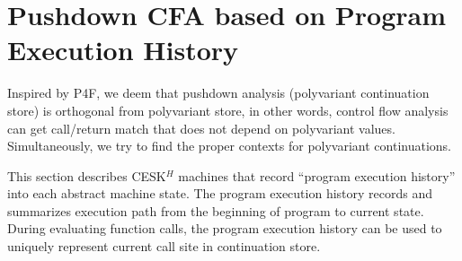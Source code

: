 \documentclass{article}
\begin{document}
\section{Pushdown CFA based on Program Execution History}
\label{sec:hcfa}
Inspired by P4F, we deem that pushdown analysis (polyvariant continuation store) is orthogonal from polyvariant store, in other words, control flow analysis can get call/return match that does not depend on polyvariant values. Simultaneously, we try to find the proper contexts for polyvariant continuations.

This section describes CESK$^H$ machines that record ``program execution history'' into each abstract machine state.
The program execution history records and summarizes execution path from the beginning of program to current state.
During evaluating function calls, the program execution history can be used to uniquely represent current call site in continuation store.
\end{document}
